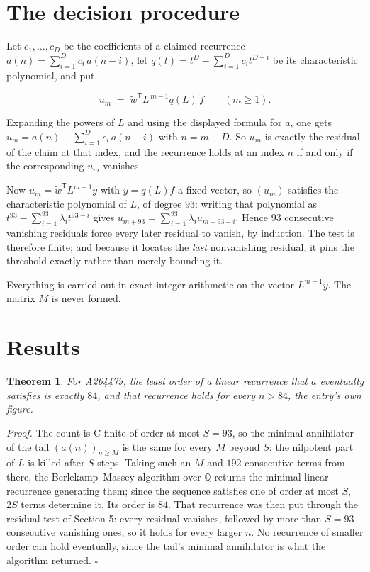 \documentclass[11pt]{article}
\newtheorem{theorem}{Theorem}
\theoremstyle{definition}
\begin{document}
\section{The decision procedure}

Let $c_1,\dots,c_D$ be the coefficients of a claimed recurrence $a(n) = \sum_{i=1}^{D} c_i\,a(n-i)$, let $q(t) = t^{D} - \sum_{i=1}^{D} c_i t^{D-i}$ be its characteristic polynomial, and put

\[u_m \;=\; \tilde w^{\mathsf T} L^{\,m-1} q(L)\,\tilde f \qquad (m \ge 1).\]

Expanding the powers of $L$ and using the displayed formula for $a$, one gets $u_m = a(n) - \sum_{i=1}^{D} c_i\,a(n-i)$ with $n = m + D$. So $u_m$ is exactly the residual of the claim at that index, and the recurrence holds at an index $n$ if and only if the corresponding $u_m$ vanishes.

Now $u_m = \tilde w^{\mathsf T} L^{m-1} y$ with $y = q(L)\tilde f$ a fixed vector, so $(u_m)$ satisfies the characteristic polynomial of $L$, of degree $93$: writing that polynomial as $t^{93} - \sum_{i=1}^{93} \lambda_i t^{93-i}$ gives $u_{m+93} = \sum_{i=1}^{93} \lambda_i u_{m+93-i}$. Hence $93$ consecutive vanishing residuals force every later residual to vanish, by induction. The test is therefore finite; and because it locates the {\itshape last} nonvanishing residual, it pins the threshold exactly rather than merely bounding it.

Everything is carried out in exact integer arithmetic on the vector $L^{m-1}y$. The matrix $M$ is never formed.

\section{Results}

\begin{theorem} For A264479, the least order of a linear recurrence that $a$ eventually satisfies is exactly $84$, and that recurrence holds for every $n > 84$, the entry's own figure.\end{theorem}

{\itshape Proof.} The count is C-finite of order at most $S = 93$, so the minimal annihilator of the tail $(a(n))_{n \ge M}$ is the same for every $M$ beyond $S$: the nilpotent part of $L$ is killed after $S$ steps. Taking such an $M$ and $192$ consecutive terms from there, the Berlekamp--Massey algorithm over $\mathbb{Q}$ returns the minimal linear recurrence generating them; since the sequence satisfies one of order at most $S$, $2S$ terms determine it. Its order is $84$. That recurrence was then put through the residual test of Section 5: every residual vanishes, followed by more than $S = 93$ consecutive vanishing ones, so it holds for every larger $n$. No recurrence of smaller order can hold eventually, since the tail's minimal annihilator is what the algorithm returned. $\square$
\end{document}
